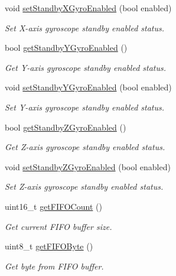 \begin{DoxyCompactItemize}
void \mbox{\hyperlink{classMPU6050_ac1c6d8f623a9ca00a4ddc50f6615b977}{set\+Standby\+X\+Gyro\+Enabled}} (bool enabled)
\begin{DoxyCompactList}\small\item\em Set X-\/axis gyroscope standby enabled status. \end{DoxyCompactList}\item 
bool \mbox{\hyperlink{classMPU6050_aaad2985f8d22aec123f1e1dabcdd427a}{get\+Standby\+Y\+Gyro\+Enabled}} ()
\begin{DoxyCompactList}\small\item\em Get Y-\/axis gyroscope standby enabled status. \end{DoxyCompactList}\item 
void \mbox{\hyperlink{classMPU6050_ab0973d64b7132188539b07991f7ea1f0}{set\+Standby\+Y\+Gyro\+Enabled}} (bool enabled)
\begin{DoxyCompactList}\small\item\em Set Y-\/axis gyroscope standby enabled status. \end{DoxyCompactList}\item 
bool \mbox{\hyperlink{classMPU6050_a20f7804db1a980a3c425ae44c33d420b}{get\+Standby\+Z\+Gyro\+Enabled}} ()
\begin{DoxyCompactList}\small\item\em Get Z-\/axis gyroscope standby enabled status. \end{DoxyCompactList}\item 
void \mbox{\hyperlink{classMPU6050_ada7c8a873fe157703dcdc08e25b48e32}{set\+Standby\+Z\+Gyro\+Enabled}} (bool enabled)
\begin{DoxyCompactList}\small\item\em Set Z-\/axis gyroscope standby enabled status. \end{DoxyCompactList}\item 
uint16\+\_\+t \mbox{\hyperlink{classMPU6050_ad96c7a75a39327ebaae01386bcbc58dd}{get\+F\+I\+F\+O\+Count}} ()
\begin{DoxyCompactList}\small\item\em Get current F\+I\+FO buffer size. \end{DoxyCompactList}\item 
uint8\+\_\+t \mbox{\hyperlink{classMPU6050_a7733011d30d5b64564f6b5422d8639ae}{get\+F\+I\+F\+O\+Byte}} ()
\begin{DoxyCompactList}\small\item\em Get byte from F\+I\+FO buffer. \end{DoxyCompactList}\item 

\end{DoxyCompactItemize}
